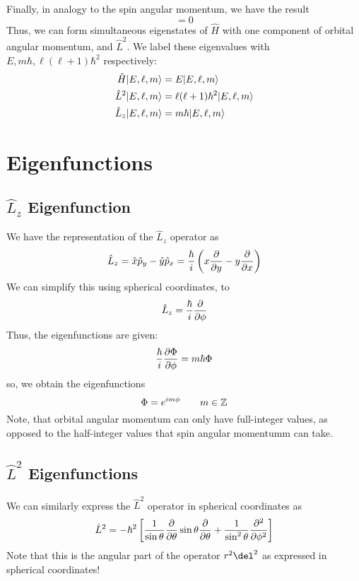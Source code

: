 Finally, in analogy to the spin angular momentum, we have the result
\begin{equation}
	[\hat L^2, \hat L_z] = 0
\end{equation}
Thus, we can form simultaneous eigenstates of \(\hat H\) with one component of orbital angular momentum, and \(\hat L^2\). We label these eigenvalues with \(E, m\hbar, \ell(\ell+1)\hbar^2\) respectively:
\begin{subequations}
	\begin{align}
		\hat H\lvert E,\ell,m\rangle& = E\lvert E,\ell,m\rangle\\
		\hat L^2\lvert E,\ell,m\rangle& = \ell(\ell+1)\hbar^2\lvert E,\ell,m\rangle\\
		\hat L_z\lvert E,\ell,m\rangle& = m\hbar\lvert E,\ell,m\rangle
	\end{align}
\end{subequations}
\section{Eigenfunctions}
\subsection{\texorpdfstring{\(\hat L_z\)}{Lz} Eigenfunction}
We have the representation of the \(\hat L_z\) operator as
\[\hat L_z = \hat x \hat p_y - \hat y \hat p_x = \frac{\hbar}{i}\left(x\frac{\partial }{\partial y}-y\frac{\partial }{\partial x}\right)\]
We can simplify this using spherical coordinates, to
\[\hat L_z = \frac{\hbar}{i}\frac{\partial }{\partial \phi}\]
Thus, the eigenfunctions are given:
\[\frac{\hbar}{i}\frac{\partial \Phi}{\partial \phi} = m\hbar \Phi\]
so, we obtain the eigenfunctions
\begin{equation}
	\Phi = e^{im\phi}\qquad m\in\mathbb{Z}
\end{equation}
Note, that orbital angular momentum can only have full-integer values, as opposed to the half-integer values that spin angular momentumm can take.

\subsection{\texorpdfstring{\(\hat L^2\)}{L2} Eigenfunctions}
We can similarly express the \(\hat L^2\) operator in spherical coordinates as
\begin{equation}
	\hat L^2 = -\hbar^2 \left[\frac{1}{\sin\theta}\frac{\partial }{\partial \theta}\sin\theta\frac{\partial }{\partial \theta}+\frac{1}{\sin^2\theta}\frac{\partial ^2}{\partial \phi^2}\right]
\end{equation}
Note that this is the angular part of the operator \(r^2\del^2\) as expressed in spherical coordinates!

